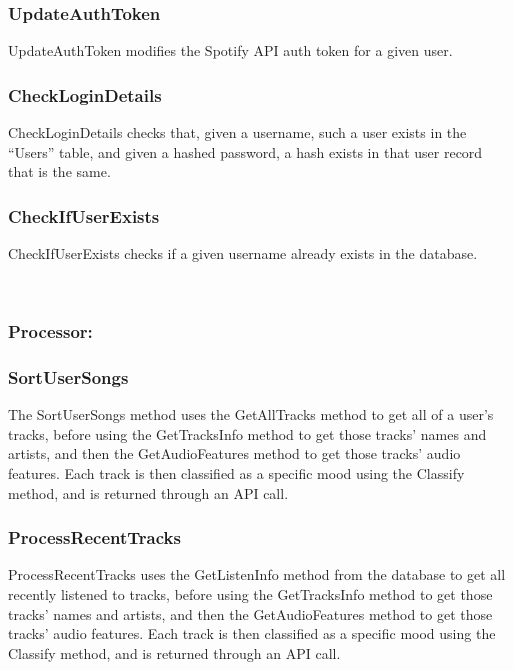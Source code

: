 \documentclass[10pt, notitlepage]{report}
\begin{document}
\subsubsection{UpdateAuthToken}
UpdateAuthToken modifies the Spotify API auth token for a given user.

\subsubsection{CheckLoginDetails}
CheckLoginDetails checks that, given a username, such a user exists in the “Users” table, and given a hashed password, a hash exists in that user record that is the same.

\subsubsection{CheckIfUserExists}
CheckIfUserExists checks if a given username already exists in the database.



\leavevmode \\

\subsubsection{Processor:}

\hrulefill

\subsubsection{SortUserSongs}
The SortUserSongs method uses the GetAllTracks method to get all of a user’s tracks, before using the GetTracksInfo method to get those tracks’ names and artists, and then the GetAudioFeatures method to get those tracks’ audio features. Each track is then classified as a specific mood using the Classify method, and is returned through an API call.

\subsubsection{ProcessRecentTracks}
ProcessRecentTracks uses the GetListenInfo method from the database to get all recently listened to tracks, before using the GetTracksInfo method to get those tracks’ names and artists, and then the GetAudioFeatures method to get those tracks’ audio features. Each track is then classified as a specific mood using the Classify method, and is returned through an API call.
\end{document}
